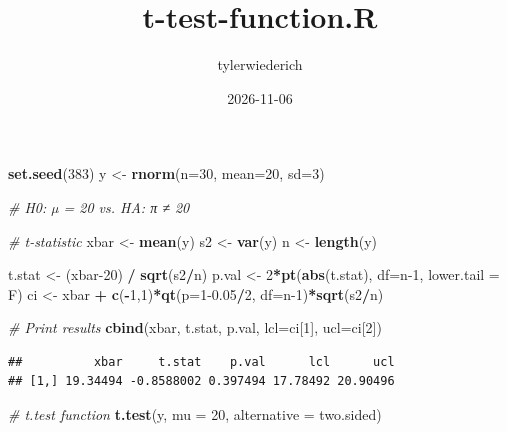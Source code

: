 \documentclass[
]{article}
\title{t-test-function.R}
\author{tylerwiederich}
\date{2026-11-06}
\newenvironment{Shaded}{\begin{snugshade}}{\end{snugshade}}
\newcommand{\AttributeTok}[1]{\textcolor[rgb]{0.13,0.29,0.53}{#1}}
\newcommand{\CommentTok}[1]{\textcolor[rgb]{0.56,0.35,0.01}{\textit{#1}}}
\newcommand{\DecValTok}[1]{\textcolor[rgb]{0.00,0.00,0.81}{#1}}
\newcommand{\FloatTok}[1]{\textcolor[rgb]{0.00,0.00,0.81}{#1}}
\newcommand{\FunctionTok}[1]{\textcolor[rgb]{0.13,0.29,0.53}{\textbf{#1}}}
\newcommand{\NormalTok}[1]{#1}
\newcommand{\OtherTok}[1]{\textcolor[rgb]{0.56,0.35,0.01}{#1}}
\newcommand{\SpecialCharTok}[1]{\textcolor[rgb]{0.81,0.36,0.00}{\textbf{#1}}}
\newcommand{\StringTok}[1]{\textcolor[rgb]{0.31,0.60,0.02}{#1}}
\begin{document}
\maketitle

\begin{Shaded}
\begin{Highlighting}[]
\FunctionTok{set.seed}\NormalTok{(}\DecValTok{383}\NormalTok{)}
\NormalTok{y }\OtherTok{\textless{}{-}} \FunctionTok{rnorm}\NormalTok{(}\AttributeTok{n=}\DecValTok{30}\NormalTok{, }\AttributeTok{mean=}\DecValTok{20}\NormalTok{, }\AttributeTok{sd=}\DecValTok{3}\NormalTok{)}

\CommentTok{\# H0: µ = 20 vs. HA: π ≠ 20}

\CommentTok{\# t{-}statistic}
\NormalTok{xbar }\OtherTok{\textless{}{-}} \FunctionTok{mean}\NormalTok{(y)}
\NormalTok{s2 }\OtherTok{\textless{}{-}} \FunctionTok{var}\NormalTok{(y)}
\NormalTok{n }\OtherTok{\textless{}{-}} \FunctionTok{length}\NormalTok{(y)}

\NormalTok{t.stat }\OtherTok{\textless{}{-}}\NormalTok{ (xbar}\DecValTok{{-}20}\NormalTok{) }\SpecialCharTok{/} \FunctionTok{sqrt}\NormalTok{(s2}\SpecialCharTok{/}\NormalTok{n)}
\NormalTok{p.val }\OtherTok{\textless{}{-}} \DecValTok{2}\SpecialCharTok{*}\FunctionTok{pt}\NormalTok{(}\FunctionTok{abs}\NormalTok{(t.stat), }\AttributeTok{df=}\NormalTok{n}\DecValTok{{-}1}\NormalTok{, }\AttributeTok{lower.tail =}\NormalTok{ F)}
\NormalTok{ci }\OtherTok{\textless{}{-}}\NormalTok{ xbar }\SpecialCharTok{+} \FunctionTok{c}\NormalTok{(}\SpecialCharTok{{-}}\DecValTok{1}\NormalTok{,}\DecValTok{1}\NormalTok{)}\SpecialCharTok{*}\FunctionTok{qt}\NormalTok{(}\AttributeTok{p=}\DecValTok{1}\FloatTok{{-}0.05}\SpecialCharTok{/}\DecValTok{2}\NormalTok{, }\AttributeTok{df=}\NormalTok{n}\DecValTok{{-}1}\NormalTok{)}\SpecialCharTok{*}\FunctionTok{sqrt}\NormalTok{(s2}\SpecialCharTok{/}\NormalTok{n)}

\CommentTok{\# Print results}
\FunctionTok{cbind}\NormalTok{(xbar, t.stat, p.val, }\AttributeTok{lcl=}\NormalTok{ci[}\DecValTok{1}\NormalTok{], }\AttributeTok{ucl=}\NormalTok{ci[}\DecValTok{2}\NormalTok{])}
\end{Highlighting}
\end{Shaded}

\begin{verbatim}
##          xbar     t.stat    p.val      lcl      ucl
## [1,] 19.34494 -0.8588002 0.397494 17.78492 20.90496
\end{verbatim}

\begin{Shaded}
\begin{Highlighting}[]
\CommentTok{\# t.test function}
\FunctionTok{t.test}\NormalTok{(y, }\AttributeTok{mu =} \DecValTok{20}\NormalTok{, }\AttributeTok{alternative =} \StringTok{\textquotesingle{}two.sided\textquotesingle{}}\NormalTok{)}
\end{Highlighting}
\end{Shaded}
\end{document}
